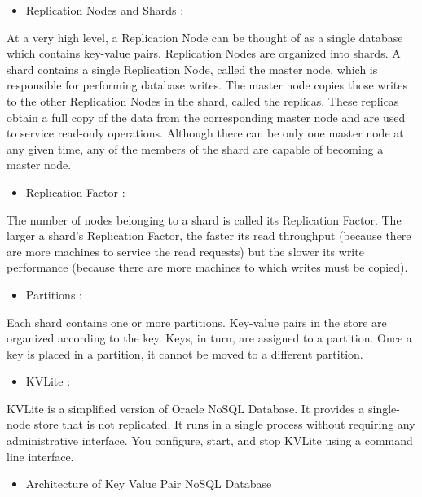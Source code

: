 \begin{itemize}
    \item Replication Nodes and Shards :
\end{itemize}
\hspace*{0.7in} At a very high level, a Replication Node can be thought of as a single database which contains key-value pairs. Replication Nodes are organized into shards. A shard contains a single Replication Node, called the master node, which is responsible for performing database writes. The master node copies those writes to the other Replication Nodes in the shard, called the replicas. These replicas obtain a full copy of the data from the corresponding master node and are used to service read-only operations. Although there can be only one master node at any given time, any of the members of the shard are capable of becoming a master node.
\\
\begin{itemize}
    \item Replication Factor :
\end{itemize}
\hspace*{0.7in} The number of nodes belonging to a shard is called its Replication Factor. The larger a shard's Replication Factor, the faster its read throughput (because there are more machines to service the read requests) but the slower its write performance (because there are more machines to which writes must be copied).
\\
\begin{itemize}
    \item Partitions :
\end{itemize}
\hspace*{0.7in} Each shard contains one or more partitions. Key-value pairs in the store are organized according to the key. Keys, in turn, are assigned to a partition. Once a key is placed in a partition, it cannot be moved to a different partition.
\\
\begin{itemize}
    \item KVLite :
\end{itemize}
\hspace*{0.7in} KVLite is a simplified version of Oracle NoSQL Database. It provides a single-node store that is not replicated. It runs in a single process without requiring any administrative interface. You configure, start, and stop KVLite using a command line interface.

\begin{itemize}
    \item Architecture of Key Value Pair NoSQL Database
\end{itemize}

